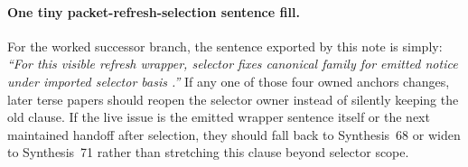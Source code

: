 \documentclass[11pt]{article}
\begin{document}
\paragraph{One tiny packet-refresh-selection sentence fill.}
For the worked successor branch, the sentence exported by this note is simply: \emph{``For this visible refresh wrapper, selector  fixes canonical family  for emitted notice  under imported selector basis .''} If any one of those four owned anchors changes, later terse papers should reopen the selector owner instead of silently keeping the old clause. If the live issue is the emitted wrapper sentence itself or the next maintained handoff after selection, they should fall back to Synthesis~68 or widen to Synthesis~71 rather than stretching this clause beyond selector scope.\cite{series:workedexample}

\clearpage
\end{document}
